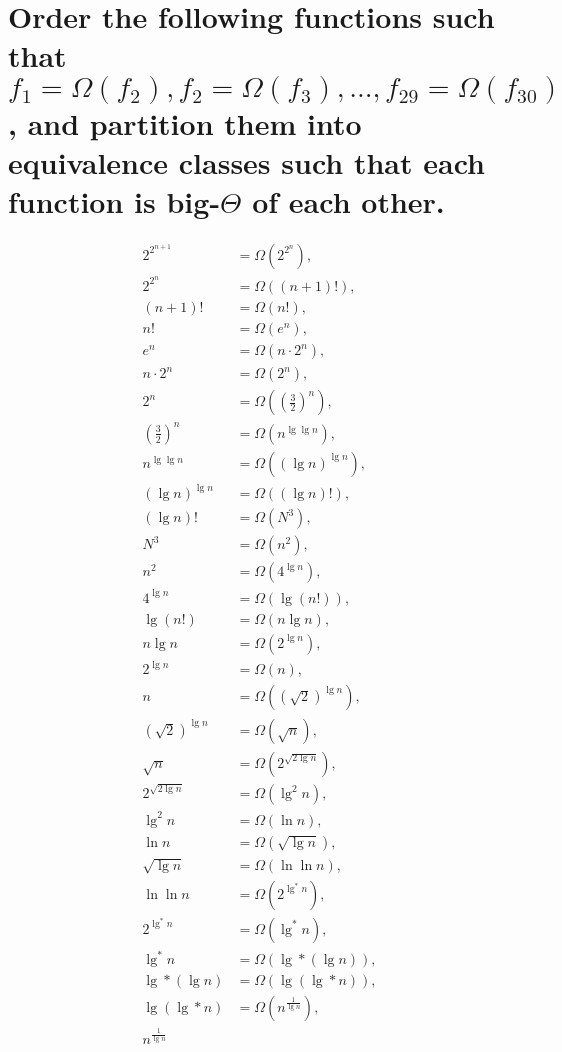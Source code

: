 \section[Problem 6]{Order the following functions such that $f_1 = \Omega(f_2), f_2 = \Omega(f_3), ..., f_{29} = \Omega(f_{30})$, and partition them into equivalence classes such that each function is big-$\Theta$ of each other.}

\begin{align*}
	2^{2^{n + 1}} &= \Omega(2^{2^n}), \\
	2^{2^n} &= \Omega((n + 1)!), \\
	(n + 1)! &= \Omega(n!), \\
	n! &= \Omega(e^n), \\
	e^n &= \Omega(n \cdot 2^n), \\
	n \cdot 2^n &= \Omega(2^n), \\
	2^n &= \Omega(\left( \frac{3}{2} \right)^n), \\
	\left( \frac{3}{2} \right)^n &= \Omega(n^{\lg \lg n}), \\
	n^{\lg \lg n} &= \Omega(\left( \lg n \right)^{\lg n}), \\
	\left( \lg n \right)^{\lg n} &= \Omega((\lg n)!), \\
	(\lg n)! &= \Omega(N^3), \\
	N^3 &= \Omega(n^2), \\
	n^2 &= \Omega(4^{\lg n}), \\
	4^{\lg n} &= \Omega(\lg (n!)), \\
	\lg (n!) &= \Omega(n \lg n), \\
	n \lg n &= \Omega(2^{\lg n}), \\
	2^{\lg n} &= \Omega(n), \\
	n &= \Omega(\left( \sqrt{2} \right)^{\lg n}), \\
	\left( \sqrt{2} \right)^{\lg n} &= \Omega(\sqrt{n}), \\
	\sqrt{n} &= \Omega(2^{\sqrt{2 \lg n}}), \\
	2^{\sqrt{2 \lg n}} &= \Omega(\lg ^2 n), \\
	\lg ^2 n &= \Omega(\ln n), \\
	\ln n &= \Omega(\sqrt{\lg n}), \\
	\sqrt{\lg n} &= \Omega(\ln \ln n), \\
	\ln \ln n &= \Omega(2^{\lg ^* n}), \\
	2^{\lg ^* n} &= \Omega(\lg ^* n), \\
	\lg ^* n &= \Omega(\lg * (\lg n)), \\
	\lg * (\lg n) &= \Omega(\lg (\lg * n)), \\
	\lg (\lg * n) &= \Omega(n^{\frac{1}{\lg n}}), \\
	n^{\frac{1}{\lg n}}
\end{align*}
